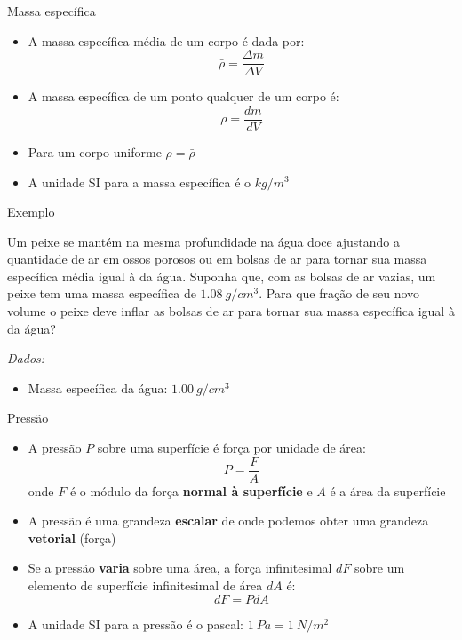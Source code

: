 \begin{frame}{Massa específica}
    \begin{itemize}
        \item A massa específica média de um corpo é dada por:
            \[
                \bar{\rho} = \frac{\Delta  m}{\Delta V}
            \]

        \item A massa específica de um ponto qualquer de um corpo é:
            \[
                \rho = \frac{dm}{dV}
            \]
        \item Para um corpo uniforme $\rho = \bar{\rho}$

        \item A unidade SI para a massa específica é o $\si{kg/m^3}$
    \end{itemize}

\end{frame}

\begin{frame}{Exemplo}
    \begin{minipage}{\textwidth}
        Um peixe se mantém na mesma profundidade na água doce ajustando a quantidade
        de ar em ossos porosos ou em bolsas de ar para tornar sua massa específica média
        igual à da água. Suponha que, com as bolsas de ar vazias, um peixe tem uma massa
        específica de \(\SI{1,08}{g/cm^3}\). Para que fração de seu novo volume o peixe deve inflar
        as bolsas de ar para tornar sua massa específica igual à da água?
    \end{minipage}

    \vspace{1cm}
    \textit{Dados:}
    \begin{itemize}
        \item Massa específica da água: \(\SI{1,00}{g/cm^3}\)
    \end{itemize}
\end{frame}

\begin{frame}{Pressão}

    \begin{itemize}
        \item A pressão $P$ sobre uma superfície é força por unidade de área:
            \[
                P=\frac{F}{A}
            \]
            onde $F$ é o módulo da força \textbf{normal à superfície} e $A$ é a área da superfície
        \item A pressão é uma grandeza \textbf{escalar} de onde podemos obter uma grandeza \textbf{vetorial} (força)

        \item Se a pressão \textbf{varia} sobre uma área, a força infinitesimal $dF$ sobre um elemento de superfície infinitesimal de área $dA$ é:
            \[
                dF=P dA
            \]
        \item A unidade SI para a pressão é o pascal: $\SI{1}{Pa} = \SI{1}{N/m^2}$
    \end{itemize}
\end{frame}

